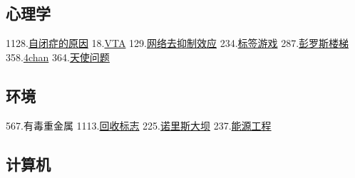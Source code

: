 \subsection{心理学}
1128.\href{https://wuli.wiki/assets/sogou/1128.\%E8\%87\%AA\%E9\%97\%AD\%E7\%97\%87\%E7\%9A\%84\%E5\%8E\%9F\%E5\%9B\%A0\%20-\%20\%E6\%90\%9C\%E7\%8B\%97\%E7\%A7\%91\%E5\%AD\%A6\%E7\%99\%BE\%E7\%A7\%91.html}{自闭症的原因}
18.\href{https://wuli.wiki/assets/sogou/18.VTA\%20-\%20\%E6\%90\%9C\%E7\%8B\%97\%E7\%A7\%91\%E5\%AD\%A6\%E7\%99\%BE\%E7\%A7\%91.html}{VTA}
129.\href{https://wuli.wiki/assets/sogou/129.\%E7\%BD\%91\%E7\%BB\%9C\%E5\%8E\%BB\%E6\%8A\%91\%E5\%88\%B6\%E6\%95\%88\%E5\%BA\%94\%20-\%20\%E6\%90\%9C\%E7\%8B\%97\%E7\%A7\%91\%E5\%AD\%A6\%E7\%99\%BE\%E7\%A7\%91.html}{网络去抑制效应}
234.\href{https://wuli.wiki/assets/sogou/234.\%E6\%A0\%87\%E7\%AD\%BE\%E6\%B8\%B8\%E6\%88\%8F\%20-\%20\%E6\%90\%9C\%E7\%8B\%97\%E7\%A7\%91\%E5\%AD\%A6\%E7\%99\%BE\%E7\%A7\%91.html}{标签游戏}
287.\href{https://wuli.wiki/assets/sogou/287.\%E5\%BD\%AD\%E7\%BD\%97\%E6\%96\%AF\%E6\%A5\%BC\%E6\%A2\%AF\%20-\%20\%E6\%90\%9C\%E7\%8B\%97\%E7\%A7\%91\%E5\%AD\%A6\%E7\%99\%BE\%E7\%A7\%91.html}{彭罗斯楼梯}
358.\href{https://wuli.wiki/assets/sogou/358.4chan\%20-\%20\%E6\%90\%9C\%E7\%8B\%97\%E7\%A7\%91\%E5\%AD\%A6\%E7\%99\%BE\%E7\%A7\%91.html}{4chan}
364.\href{https://wuli.wiki/assets/sogou/364.\%E5\%A4\%A9\%E4\%BD\%BF\%E9\%97\%AE\%E9\%A2\%98\%20-\%20\%E6\%90\%9C\%E7\%8B\%97\%E7\%A7\%91\%E5\%AD\%A6\%E7\%99\%BE\%E7\%A7\%91.html}{天使问题}

\subsection{环境}
567.有毒重金属
1113.\href{https://wuli.wiki/assets/sogou/1113.\%E5\%9B\%9E\%E6\%94\%B6\%E6\%A0\%87\%E5\%BF\%97\%20-\%20\%E6\%90\%9C\%E7\%8B\%97\%E7\%A7\%91\%E5\%AD\%A6\%E7\%99\%BE\%E7\%A7\%91.html}{回收标志}
225.\href{https://wuli.wiki/assets/sogou/225.\%E8\%AF\%BA\%E9\%87\%8C\%E6\%96\%AF\%E5\%A4\%A7\%E5\%9D\%9D\%20-\%20\%E6\%90\%9C\%E7\%8B\%97\%E7\%A7\%91\%E5\%AD\%A6\%E7\%99\%BE\%E7\%A7\%91.html}{诺里斯大坝}
237.\href{https://wuli.wiki/assets/sogou/237.\%E8\%83\%BD\%E6\%BA\%90\%E5\%B7\%A5\%E7\%A8\%8B\%20-\%20\%E6\%90\%9C\%E7\%8B\%97\%E7\%A7\%91\%E5\%AD\%A6\%E7\%99\%BE\%E7\%A7\%91.html}{能源工程}

\subsection{计算机}
